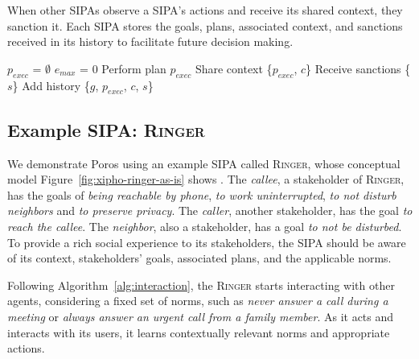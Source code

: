\documentclass[11pt,          %
               phd,           %
               onehalfspacing %
               ]{ncsuthesis}
\newcommand{\fsc}{\textsc}
\newcommand{\fsl}{\textsl}
\newcommand{\frameworkB}{Poros\xspace}
\newcommand{\ringer}{\fsc{Ringer}\xspace}
\newcommand{\nsa}[1]{\textcolor{green!50!black}{NSA:~~#1}}
\begin{document}
When other SIPAs observe a SIPA's actions and receive its shared
context, they sanction it. Each SIPA stores the goals, plans, associated
context, and sanctions received in its history to facilitate future
decision making.

\begin{algorithm}[!htb]
\caption{Interaction and learning in \frameworkB.}
\label{alg:interaction}
{}
$p_{exec}$ = $\emptyset$\;
$e_{max}$ = $0$\; 
\ForEach{$p_i \in P$ where $p_i$ satisfies $g$ under $c$}{
  $h$ = hasHistory($G$, $p$, $c$)\;
 \eIf{$h$}{
  $exp_i$ = predictExperience($p_i$, $c$, $h$)\;
  \If{$exp_i > e_{max}$}{
  $exp_{max}$ = $exp_i$\;
  $p_{exec}$ = $p_i$\;
  }
 }{
  $p_{exec}$ = $p_i$\;
 }
}
  Perform plan $p_{exec}$\;
  Share context \{$p_{exec}$, $c$\}\;
  Receive sanctions \{$s$\}\;
  Add history \{$g$, $p_{exec}$, $c$, $s$\}\;      
\end{algorithm}


        

\subsection{Example SIPA: \ringer}
\label{sec:ringer-framework}
We demonstrate \frameworkB using an example SIPA called \ringer,
whose conceptual model Figure~\ref{fig:xipho-ringer-as-is} shows 
\citep{Murukannaiah-AAMAS14-Xipho}. The \fsl{callee}, a
stakeholder of \ringer, has the goals of \fsl{being reachable by
phone}, \fsl{to work uninterrupted}, \fsl{to not disturb neighbors}
and \fsl{to preserve privacy}. The \fsl{caller}, another stakeholder,
has the goal \fsl{to reach the callee}.  The \fsl{neighbor}, also
a stakeholder, has a goal \fsl{to not be disturbed}. To provide a
rich social experience to its stakeholders, the SIPA should be aware
of its context, stakeholders' goals, associated plans, and the applicable 
norms. 


    
Following Algorithm~\ref{alg:interaction}, the \ringer starts
interacting with other agents, considering a fixed set of norms, such as
\fsl{never answer a call during a meeting} or \fsl{always answer an
urgent call from a family member}. As it acts and interacts with its
users, it learns contextually relevant norms and appropriate actions.
\end{document}
